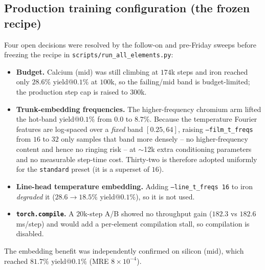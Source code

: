 \documentclass[11pt,a4paper]{article}
\newcommand{\code}[1]{\texttt{#1}}
\begin{document}
\subsection{Production training configuration (the frozen recipe)}
\label{sec:production}

Four open decisions were resolved by the follow-on and pre-Friday sweeps
before freezing the recipe in \code{scripts/run\_all\_elements.py}:
\begin{itemize}
\item \textbf{Budget.} Calcium (mid) was still climbing at $174$k steps and
iron reached only $28.6\%$ yield@$0.1\%$ at $100$k, so the failing/mid band
is budget-limited; the production step cap is raised to $300$k.
\item \textbf{Trunk-embedding frequencies.} The higher-frequency chromium
arm lifted the hot-band yield@$0.1\%$ from $0.0$ to $8.7\%$. Because the
temperature Fourier features are log-spaced over a \emph{fixed} band
$[0.25,64]$, raising \code{--film\_t\_freqs} from $16$ to $32$ only samples
that band more densely -- no higher-frequency content and hence no ringing
risk -- at $\sim$12k extra conditioning parameters and no measurable
step-time cost. Thirty-two is therefore adopted uniformly for the
\code{standard} preset (it is a superset of $16$).
\item \textbf{Line-head temperature embedding.} Adding
\code{--line\_t\_freqs 16} to iron \emph{degraded} it ($28.6\to18.5\%$
yield@$0.1\%$), so it is not used.
\item \textbf{\code{torch.compile}.} A $20$k-step A/B showed no throughput
gain ($182.3$ vs $182.6$\,ms/step) and would add a per-element compilation
stall, so compilation is disabled.
\end{itemize}
The embedding benefit was independently confirmed on silicon (mid), which
reached $81.7\%$ yield@$0.1\%$ (MRE $8\times10^{-4}$).
\end{document}
